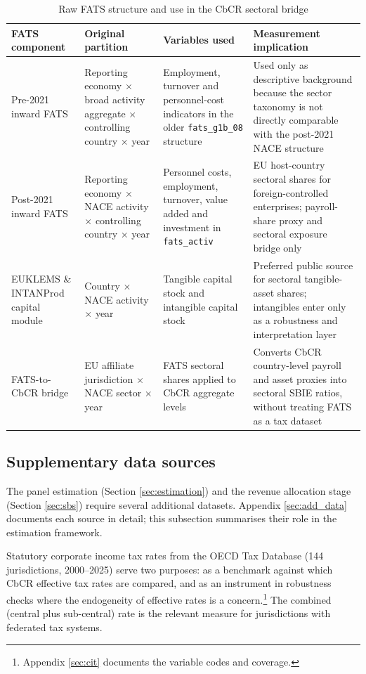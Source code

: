 \documentclass[11pt,a4paper]{article}
\newcommand{\code}[1]{\texttt{#1}}
\begin{document}
\begin{table}[H]
\centering
\caption{Raw FATS structure and use in the CbCR sectoral bridge}
\label{tab:fats_raw_structure}
\footnotesize
\begin{tabularx}{\textwidth}{@{}L{2.8cm}L{3.2cm}L{3.8cm}X@{}}
\toprule
FATS component & Original partition & Variables used & Measurement implication \\
\midrule
Pre-2021 inward FATS & Reporting economy $\times$ broad activity aggregate $\times$ controlling country $\times$ year & Employment, turnover and personnel-cost indicators in the older \code{fats\_g1b\_08} structure & Used only as descriptive background because the sector taxonomy is not directly comparable with the post-2021 NACE structure \\
Post-2021 inward FATS & Reporting economy $\times$ NACE activity $\times$ controlling country $\times$ year & Personnel costs, employment, turnover, value added and investment in \code{fats\_activ} & EU host-country sectoral shares for foreign-controlled enterprises; payroll-share proxy and sectoral exposure bridge only \\
EUKLEMS \& INTANProd capital module & Country $\times$ NACE activity $\times$ year & Tangible capital stock and intangible capital stock & Preferred public source for sectoral tangible-asset shares; intangibles enter only as a robustness and interpretation layer \\
FATS-to-CbCR bridge & EU affiliate jurisdiction $\times$ NACE sector $\times$ year & FATS sectoral shares applied to CbCR aggregate levels & Converts CbCR country-level payroll and asset proxies into sectoral SBIE ratios, without treating FATS as a tax dataset \\
\bottomrule
\end{tabularx}
\end{table}

\subsection{Supplementary data sources}\label{sec:supplementary}

The panel estimation (Section \ref{sec:estimation}) and the revenue allocation stage (Section \ref{sec:sbs}) require several additional datasets. Appendix \ref{sec:add_data} documents each source in detail; this subsection summarises their role in the estimation framework.

Statutory corporate income tax rates from the OECD Tax Database (144 jurisdictions, 2000--2025) serve two purposes: as a benchmark against which CbCR effective tax rates are compared, and as an instrument in robustness checks where the endogeneity of effective rates is a concern.\footnote{Appendix \ref{sec:cit} documents the variable codes and coverage.} The combined (central plus sub-central) rate is the relevant measure for jurisdictions with federated tax systems.
\end{document}
